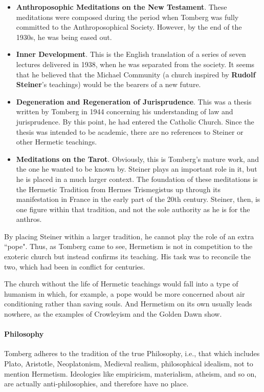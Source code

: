 \begin{itemize}
\item \textbf{Anthroposophic Meditations on the New Testament}. These meditations were composed during the period when Tomberg was fully committed to the Anthroposophical Society. However, by the end of the 1930s, he was being eased out. 
\item \textbf{Inner Development}. This is the English translation of a series of seven lectures delivered in 1938, when he was separated from the society. It seems that he believed that the Michael Community (a church inspired by \textbf{Rudolf Steiner}'s teachings) would be the bearers of a new future. 
\item \textbf{Degeneration and Regeneration of Jurisprudence}. This was a thesis written by Tomberg in 1944 concerning his understanding of law and jurisprudence. By this point, he had entered the Catholic Church. Since the thesis was intended to be academic, there are no references to Steiner or other Hermetic teachings. 
\item \textbf{Meditations on the Tarot}. Obviously, this is Tomberg's mature work, and the one he wanted to be known by. Steiner plays an important role in it, but he is placed in a much larger context. The foundation of these meditations is the Hermetic Tradition from Hermes Trismegistus up through its manifestation in France in the early part of the 20th century. Steiner, then, is one figure within that tradition, and not the sole authority as he is for the anthros. 
\end{itemize}
By placing Steiner within a larger tradition, he cannot play the role of an extra ``pope". Thus, as Tomberg came to see, Hermetism is not in competition to the exoteric church but instead confirms its teaching. His task was to reconcile the two, which had been in conflict for centuries.

The church without the life of Hermetic teachings would fall into a type of humanism in which, for example, a pope would be more concerned about air conditioning rather than saving souls. And Hermetism on its own usually leads nowhere, as the examples of Crowleyism and the Golden Dawn show.

\paragraph{Philosophy}
Tomberg adheres to the tradition of the true Philosophy, i.e., that which includes Plato, Aristotle, Neoplatonism, Medieval realism, philosophical idealism, not to mention Hermetism. Ideologies like empiricism, materialism, atheism, and so on, are actually anti-philosophies, and therefore have no place.

